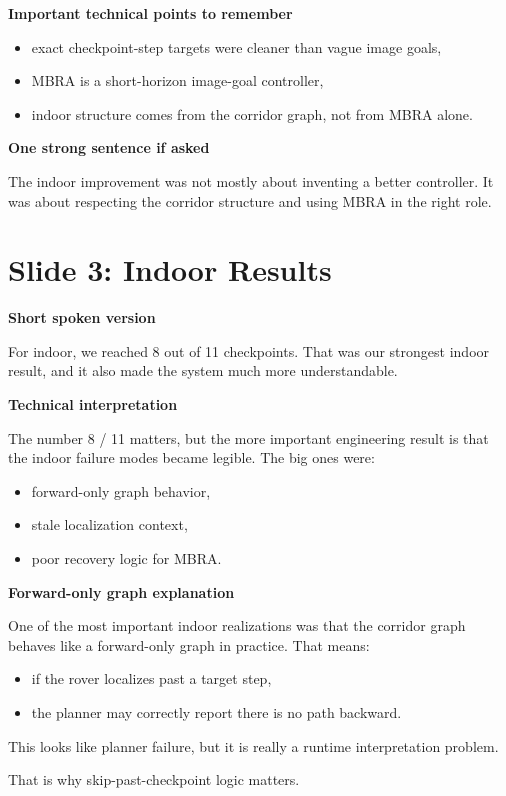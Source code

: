 \documentclass[11pt]{article}
\begin{document}
\textbf{Important technical points to remember}
\begin{itemize}[leftmargin=*]
\item exact checkpoint-step targets were cleaner than vague image goals,
\item MBRA is a short-horizon image-goal controller,
\item indoor structure comes from the corridor graph, not from MBRA alone.
\end{itemize}

\textbf{One strong sentence if asked}

The indoor improvement was not mostly about inventing a better controller. It was about respecting the corridor structure and using MBRA in the right role.

\section*{Slide 3: Indoor Results}
\textbf{Short spoken version}

For indoor, we reached 8 out of 11 checkpoints. That was our strongest indoor result, and it also made the system much more understandable.

\textbf{Technical interpretation}

The number 8 / 11 matters, but the more important engineering result is that the indoor failure modes became legible. The big ones were:
\begin{itemize}[leftmargin=*]
\item forward-only graph behavior,
\item stale localization context,
\item poor recovery logic for MBRA.
\end{itemize}

\textbf{Forward-only graph explanation}

One of the most important indoor realizations was that the corridor graph behaves like a forward-only graph in practice. That means:
\begin{itemize}[leftmargin=*]
\item if the rover localizes past a target step,
\item the planner may correctly report there is no path backward.
\end{itemize}

This looks like planner failure, but it is really a runtime interpretation problem.

That is why skip-past-checkpoint logic matters.
\end{document}
